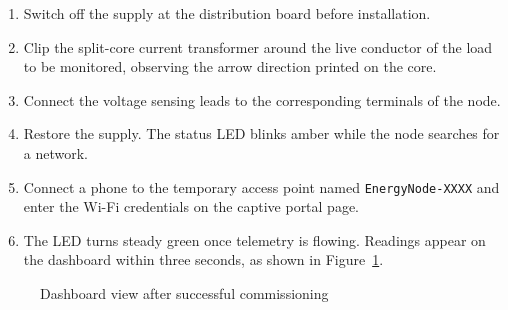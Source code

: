 \documentclass[12pt,a4paper]{report}
\newcommand{\phbox}[2][0.72\textwidth]{%
  \fbox{\parbox[c][#2][c]{#1}{\centering\fontsize{34}{40}\selectfont Figure}}%
}
\begin{document}
\begin{enumerate}[leftmargin=1.4cm]
  \item Switch off the supply at the distribution board before installation.
  \item Clip the split-core current transformer around the live conductor of the
        load to be monitored, observing the arrow direction printed on the core.
  \item Connect the voltage sensing leads to the corresponding terminals of the node.
  \item Restore the supply. The status LED blinks amber while the node searches
        for a network.
  \item Connect a phone to the temporary access point named \texttt{EnergyNode-XXXX}
        and enter the Wi-Fi credentials on the captive portal page.
  \item The LED turns steady green once telemetry is flowing. Readings appear on
        the dashboard within three seconds, as shown in Figure~\ref{fig:dash}.
\end{enumerate}

\begin{figure}[H]
  \centering
  \phbox{2.6in}
  \caption{Dashboard view after successful commissioning}
  \label{fig:dash}
\end{figure}
\end{document}
